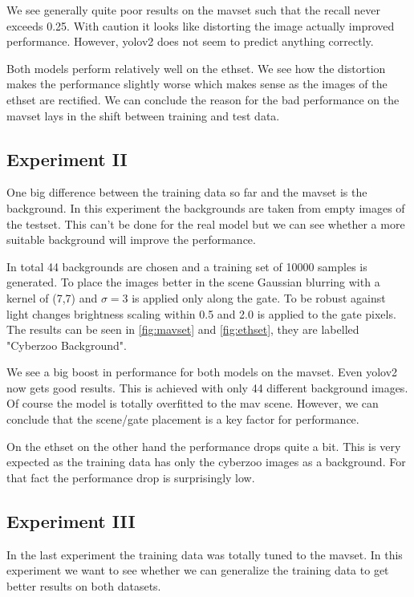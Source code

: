 \documentclass{article}
\begin{document}
We see generally quite poor results on the mavset such that the recall never exceeds 0.25. With caution it looks like distorting the image actually improved performance. However, yolov2 does not seem to predict anything correctly. 

Both models perform relatively well on the ethset. We see how the distortion makes the performance slightly worse which makes sense as the images of the ethset are rectified. We can conclude the reason for the bad performance on the mavset lays in the shift between training and test data.

\subsection{Experiment II}

One big difference between the training data so far and the mavset is the background. In this experiment the backgrounds are taken from empty images of the testset. This can't be done for the real model but we can see whether a more suitable background will improve the performance. 

In total 44 backgrounds are chosen and a training set of 10000 samples is generated. To place the images better in the scene Gaussian blurring with a kernel of (7,7) and $\sigma = 3$ is applied only along the gate. To be robust against light changes brightness scaling within 0.5 and 2.0 is applied to the gate pixels. The results can be seen in \autoref{fig:mavset} and \autoref{fig:ethset}, they are labelled "Cyberzoo Background".

We see a big boost in performance for both models on the mavset. Even yolov2 now gets good results. This is achieved with only 44 different background images. Of course the model is totally overfitted to the mav scene. However, we can conclude that the scene/gate placement is a key factor for performance.

On the ethset on the other hand the performance drops quite a bit. This is very expected as the training data has only the cyberzoo images as a background. For that fact the performance drop is surprisingly low.

\subsection{Experiment III}

In the last experiment the training data was totally tuned to the mavset. In this experiment we want to see whether we can generalize the training data to get better results on both datasets.
\end{document}

